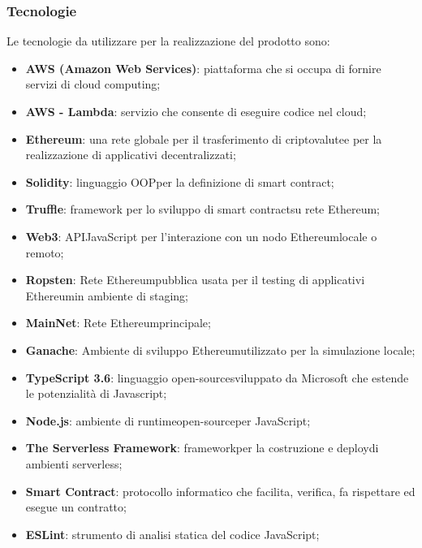 \subsubsection{Tecnologie}
Le tecnologie da utilizzare per la realizzazione del prodotto sono:
\begin{itemize}
	\item \textbf{AWS (Amazon Web Services)}: piattaforma che si occupa di fornire servizi di cloud computing\glos;
	\item \textbf{AWS - Lambda}: servizio che consente di eseguire codice nel cloud\glos;
	\item \textbf{Ethereum}: una rete globale per il trasferimento di criptovalute\glo e per la realizzazione di applicativi decentralizzati;
	\item \textbf{Solidity}: linguaggio OOP\glo per la definizione di smart contract\glos;
	\item \textbf{Truffle}: framework per lo sviluppo di smart contract\glo su rete Ethereum\glo;
	\item \textbf{Web3}: API\glo JavaScript per l'interazione con un nodo Ethereum\glo locale o remoto;
	\item \textbf{Ropsten}: Rete Ethereum\glo pubblica usata per il testing di applicativi Ethereum\glo in ambiente di staging;
	\item \textbf{MainNet}: Rete Ethereum\glo principale;
	\item \textbf{Ganache}: Ambiente di sviluppo Ethereum\glo utilizzato per la simulazione locale;
	\item \textbf{TypeScript 3.6}:  linguaggio open-source\glo sviluppato da Microsoft che estende le potenzialità di Javascript;
	\item \textbf{Node.js}: ambiente di runtime\glo open-source\glo per JavaScript;
	\item \textbf{The Serverless Framework}: framework\glo per la costruzione e deploy\glo  di ambienti serverless\glos;
	\item \textbf{Smart Contract}: protocollo informatico che facilita, verifica, fa rispettare ed esegue un contratto;
	\item \textbf{ESLint}: strumento di analisi statica del codice JavaScript;
\end{itemize}
